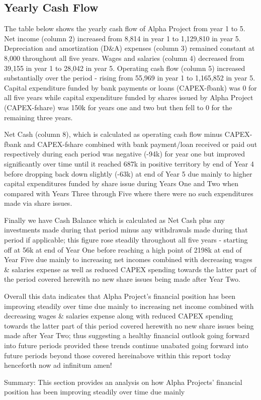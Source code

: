 

\subsection{Yearly Cash Flow}\label{sec:title}

The table below shows the yearly cash flow of Alpha Project from year 1 to 5. Net income (column 2) increased from 8,814 in year 1 to 1,129,810 in year 5. Depreciation and amortization (D&A) expenses (column 3) remained constant at 8,000 throughout all five years. Wages and salaries (column 4) decreased from 39,155 in year 1 to 28,042 in year 5. Operating cash flow (column 5) increased substantially over the period - rising from 55,969 in year 1 to 1,165,852 in year 5. Capital expenditure funded by bank payments or loans (CAPEX-fbank) was 0 for all five years while capital expenditure funded by shares issued by Alpha Project (CAPEX-fshare) was 150k for years one and two but then fell to 0 for the remaining three years. 

Net Cash (column 8), which is calculated as operating cash flow minus CAPEX-fbank and CAPEX-fshare combined with bank payment/loan received or paid out respectively during each period was negative (-94k) for year one but improved significantly over time until it reached 687k in positive territory by end of Year 4 before dropping back down slightly (-63k) at end of Year 5 due mainly to higher capital expenditures funded by share issue during Years One and Two when compared with Years Three through Five where there were no such expenditures made via share issues. 

Finally we have Cash Balance which is calculated as Net Cash plus any investments made during that period minus any withdrawals made during that period if applicable; this figure rose steadily throughout all five years - starting off at 56k at end of Year One before reaching a high point of 2198k at end of Year Five due mainly to increasing net incomes combined with decreasing wages & salaries expense as well as reduced CAPEX spending towards the latter part of the period covered herewith no new share issues being made after Year Two. 

Overall this data indicates that Alpha Project's financial position has been improving steadily over time due mainly to increasing net income combined with decreasing wages & salaries expense along with reduced CAPEX spending towards the latter part of this period covered herewith no new share issues being made after Year Two; thus suggesting a healthy financial outlook going forward into future periods provided these trends continue unabated going forward into future periods beyond those covered hereinabove within this report today henceforth now ad infinitum amen!  

Summary: This section provides an analysis on how Alpha Projects' financial position has been improving steadily over time due mainly